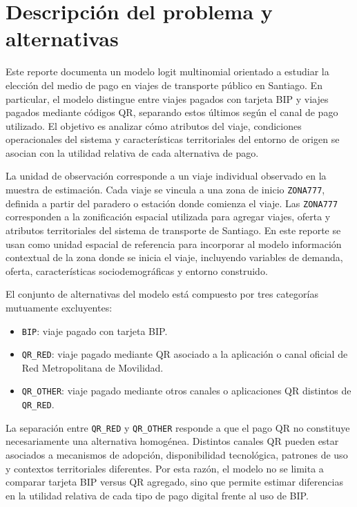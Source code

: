 \section{Descripción del problema y alternativas}

Este reporte documenta un modelo logit multinomial orientado a estudiar la elección del medio de pago en viajes de transporte público en Santiago. En particular, el modelo distingue entre viajes pagados con tarjeta BIP y viajes pagados mediante códigos QR, separando estos últimos según el canal de pago utilizado. El objetivo es analizar cómo atributos del viaje, condiciones operacionales del sistema y características territoriales del entorno de origen se asocian con la utilidad relativa de cada alternativa de pago.

La unidad de observación corresponde a un viaje individual observado en la muestra de estimación. Cada viaje se vincula a una zona de inicio \texttt{ZONA777}, definida a partir del paradero o estación donde comienza el viaje. Las \texttt{ZONA777} corresponden a la zonificación espacial utilizada para agregar viajes, oferta y atributos territoriales del sistema de transporte de Santiago. En este reporte se usan como unidad espacial de referencia para incorporar al modelo información contextual de la zona donde se inicia el viaje, incluyendo variables de demanda, oferta, características sociodemográficas y entorno construido.

El conjunto de alternativas del modelo está compuesto por tres categorías mutuamente excluyentes:
\begin{itemize}
    \item \texttt{BIP}: viaje pagado con tarjeta BIP.
    \item \texttt{QR\_RED}: viaje pagado mediante QR asociado a la aplicación o canal oficial de Red Metropolitana de Movilidad.
    \item \texttt{QR\_OTHER}: viaje pagado mediante otros canales o aplicaciones QR distintos de \texttt{QR\_RED}.
\end{itemize}

La separación entre \texttt{QR\_RED} y \texttt{QR\_OTHER} responde a que el pago QR no constituye necesariamente una alternativa homogénea. Distintos canales QR pueden estar asociados a mecanismos de adopción, disponibilidad tecnológica, patrones de uso y contextos territoriales diferentes. Por esta razón, el modelo no se limita a comparar tarjeta BIP versus QR agregado, sino que permite estimar diferencias en la utilidad relativa de cada tipo de pago digital frente al uso de BIP.
